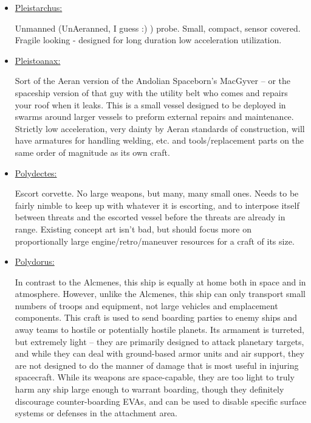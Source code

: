 \begin{itemize}
\item \href{http://vegastrike.sourceforge.net/wiki/Vessel:Pleistarchus}{Pleistarchus:}

Unmanned (UnAeranned, I guess :) ) probe. Small, compact, sensor
covered. Fragile looking - designed for long duration low acceleration
utilization.

\item \href{http://vegastrike.sourceforge.net/wiki/Vessel:Pleistoanax}{Pleistoanax:}

Sort of the Aeran version of the Andolian Spaceborn's MacGyver -- or
the spaceship version of that guy with the utility belt who comes and
repairs your roof when it leaks. This is a small vessel designed to be
deployed in swarms around larger vessels to preform external repairs
and maintenance. Strictly low acceleration, very dainty by Aeran standards of
construction, will have armatures for handling welding, etc. and
tools/replacement parts on the same order of magnitude as its own
craft.


\item \href{http://vegastrike.sourceforge.net/wiki/Vessel:Polydectes}{Polydectes:}

Escort corvette. No large weapons, but many, many small ones. Needs to
be fairly nimble to keep up with whatever it is escorting, and to
interpose itself between threats and the escorted vessel before the
threats are already in range. Existing concept art isn't bad, but
should focus more on proportionally large engine/retro/maneuver
resources for a craft of its size.



\item \href{http://vegastrike.sourceforge.net/wiki/Vessel:Polydorus}{Polydorus:}

In contrast to the Alcmenes, this ship is equally at home both in
space and in atmosphere. However, unlike the Alcmenes, this ship can
only transport small numbers of troops and equipment, not large
vehicles and emplacement components. This craft is used to send
boarding parties to enemy ships and away teams to hostile or
potentially hostile planets. Its armament is turreted, but extremely
light -- they are primarily designed to attack planetary targets, and
while they can deal with ground-based armor units and air support,
they are not designed to do the manner of damage that is most useful
in injuring spacecraft. While its weapons are space-capable, they are
too light to truly harm any ship large enough to warrant boarding,
though they definitely discourage counter-boarding EVAs, and can be
used to disable specific surface systems or defenses in the attachment
area.




\end{itemize}
